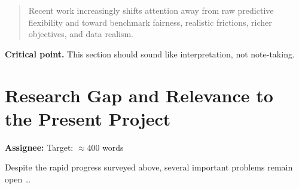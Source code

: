\documentclass[12pt, a4paper]{article}
\newcommand{\TODO}[1]{\textcolor{red}{[TODO: #1]}}
\newcommand{\crit}[1]{\noindent\textbf{Critical point.} #1}
\begin{document}
\begin{quote}
Recent work increasingly shifts attention away from raw predictive flexibility and
toward benchmark fairness, realistic frictions, richer objectives, and data realism.
\end{quote}

\crit{This section should sound like interpretation, not note-taking.}

\section{Research Gap and Relevance to the Present Project}
\label{sec:gap}

\begin{assignbox}
\textbf{Assignee:} \underline{\hspace{4cm}} \quad Target: $\approx 400$ words
\end{assignbox}

%

Despite the rapid progress surveyed above, several important problems remain open
\ldots

%
\end{document}

